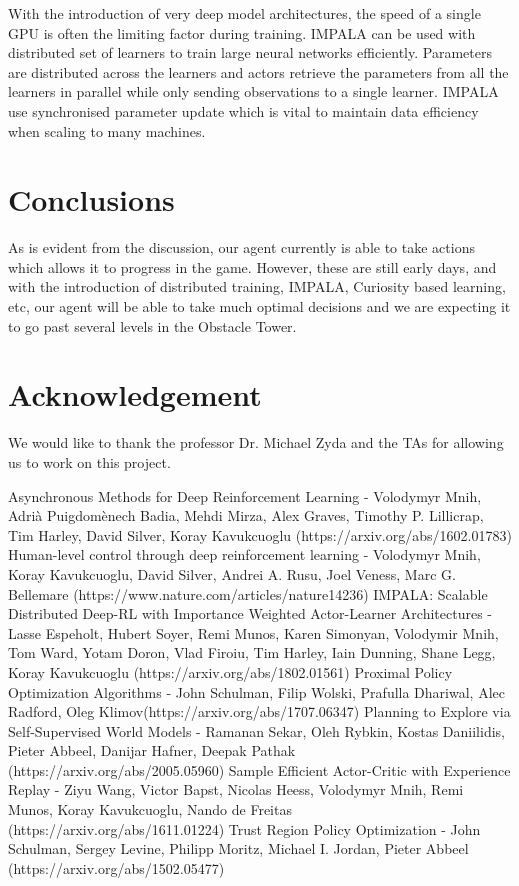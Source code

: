 \documentclass[conference]{IEEEtran}
\begin{document}
With the introduction of very deep model architectures, the speed of a single GPU is often the limiting factor during training. IMPALA can be used with distributed set of learners to train large neural networks efficiently. Parameters are distributed across the learners and actors retrieve the parameters from all the learners in parallel while only sending observations to a single learner. IMPALA use synchronised parameter update which is vital to maintain data efficiency when scaling to many machines.

\section{Conclusions}

As is evident from the discussion, our agent currently is able to take actions which allows it to progress in the game. However, these are still early days, and with the introduction of distributed training, IMPALA, Curiosity based learning, etc, our agent will be able to take much optimal decisions and we are expecting it to go past several levels in the Obstacle Tower.

\section{Acknowledgement}

We would like to thank the professor Dr. Michael Zyda and the TAs for allowing us to work on this project.

\begin{thebibliography}{00}
 Asynchronous Methods for Deep Reinforcement Learning - Volodymyr Mnih, Adrià Puigdomènech Badia, Mehdi Mirza, Alex Graves, Timothy P. Lillicrap, Tim Harley, David Silver, Koray Kavukcuoglu (https://arxiv.org/abs/1602.01783)
 Human-level control through deep reinforcement learning - Volodymyr Mnih, Koray Kavukcuoglu, David Silver, Andrei A. Rusu, Joel Veness, Marc G. Bellemare (https://www.nature.com/articles/nature14236)
 IMPALA: Scalable Distributed Deep-RL with Importance Weighted Actor-Learner Architectures - Lasse Espeholt, Hubert Soyer, Remi Munos, Karen Simonyan, Volodymir Mnih, Tom Ward, Yotam Doron, Vlad Firoiu, Tim Harley, Iain Dunning, Shane Legg, Koray Kavukcuoglu (https://arxiv.org/abs/1802.01561)
 Proximal Policy Optimization Algorithms - John Schulman, Filip Wolski, Prafulla Dhariwal, Alec Radford, Oleg Klimov(https://arxiv.org/abs/1707.06347)
 Planning to Explore via Self-Supervised World Models - Ramanan Sekar, Oleh Rybkin, Kostas Daniilidis, Pieter Abbeel, Danijar Hafner, Deepak Pathak (https://arxiv.org/abs/2005.05960)
 Sample Efficient Actor-Critic with Experience Replay - Ziyu Wang, Victor Bapst, Nicolas Heess, Volodymyr Mnih, Remi Munos, Koray Kavukcuoglu, Nando de Freitas (https://arxiv.org/abs/1611.01224)
 Trust Region Policy Optimization - John Schulman, Sergey Levine, Philipp Moritz, Michael I. Jordan, Pieter Abbeel (https://arxiv.org/abs/1502.05477)
\end{thebibliography}
\vspace{12pt}
\end{document}
